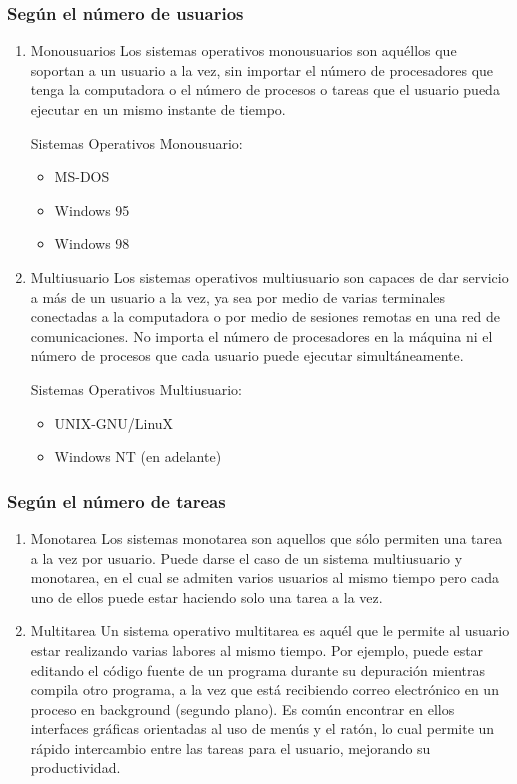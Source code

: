\documentclass[11pt]{article}
\begin{document}
\subsubsection{Según el número de usuarios}
\label{sec:orgd5cccce}
\begin{enumerate}
\item Monousuarios
\label{sec:org7a955ca}
Los sistemas operativos monousuarios son aquéllos que soportan a un
usuario a la vez, sin importar el número de procesadores que tenga la
computadora o el número de procesos o tareas que el usuario pueda
ejecutar en un mismo instante de tiempo.

Sistemas Operativos Monousuario:

\begin{itemize}
\item MS-DOS
\item Windows 95
\item Windows 98
\end{itemize}

\item Multiusuario
\label{sec:org07bf617}
Los sistemas operativos multiusuario son capaces de dar servicio a más
de un usuario a la vez, ya sea por medio de varias terminales conectadas
a la computadora o por medio de sesiones remotas en una red de
comunicaciones. No importa el número de procesadores en la máquina ni el
número de procesos que cada usuario puede ejecutar simultáneamente.

Sistemas Operativos Multiusuario:

\begin{itemize}
\item UNIX-GNU/LinuX
\item Windows NT (en adelante)
\end{itemize}
\end{enumerate}

\subsubsection{Según el número de tareas}
\label{sec:org3b2e365}
\begin{enumerate}
\item Monotarea
\label{sec:org7f5a2cb}
Los sistemas monotarea son aquellos que sólo permiten una tarea a la vez
por usuario. Puede darse el caso de un sistema multiusuario y monotarea,
en el cual se admiten varios usuarios al mismo tiempo pero cada uno de
ellos puede estar haciendo solo una tarea a la vez.

\item Multitarea
\label{sec:org9992ebf}
Un sistema operativo multitarea es aquél que le permite al usuario estar
realizando varias labores al mismo tiempo. Por ejemplo, puede estar
editando el código fuente de un programa durante su depuración mientras
compila otro programa, a la vez que está recibiendo correo electrónico
en un proceso en background (segundo plano). Es común encontrar en ellos
interfaces gráficas orientadas al uso de menús y el ratón, lo cual
permite un rápido intercambio entre las tareas para el usuario,
mejorando su productividad.

\newpage
\end{enumerate}
\end{document}
